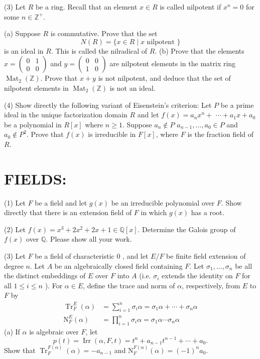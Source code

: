 \documentclass[10pt]{article}
\begin{document}
(3) Let $R$ be a ring. Recall that an element $x \in R$ is called nilpotent if $x^{n}=0$ for some $n \in \mathbb{Z}^{+}$.

(a) Suppose $R$ is commutative. Prove that the set
$$
N(R)=\{x \in R \mid x \text { nilpotent }\}
$$
is an ideal in $R$. This is called the nilradical of $R$. (b) Prove that the elements $x=\left(\begin{array}{ll}0 & 1 \\ 0 & 0\end{array}\right)$ and $y=\left(\begin{array}{cc}0 & 0 \\ 1 & 0\end{array}\right)$ are nilpotent elements in the matrix ring $\operatorname{Mat}_{2}(\mathbb{Z})$. Prove that $x+y$ is not nilpotent, and deduce that the set of nilpotent elements in $\operatorname{Mat}_{2}(\mathbb{Z})$ is not an ideal.

(4) Show directly the following variant of Eisenstein's criterion: Let $P$ be a prime ideal in the unique factorization domain $R$ and let $f(x)=a_{n} x^{n}+$ $\cdots+a_{1} x+a_{0}$ be a polynomial in $R[x]$ where $n \geq 1$. Suppose $a_{n} \notin P$ $a_{n-1}, \ldots, a_{0} \in P$ and $a_{0} \notin P^{2}$. Prove that $f(x)$ is irreducible in $F[x]$, where $F$ is the fraction field of $R$.

\section{FIELDS:}
(1) Let $F$ be a field and let $g(x)$ be an irreducible polynomial over $F$. Show directly that there is an extension field of $F$ in which $g(x)$ has a root.

(2) Let $f(x)=x^{3}+2 x^{2}+2 x+1 \in \mathbb{Q}[x]$. Determine the Galois group of $f(x)$ over $\mathbb{Q}$. Please show all your work.

(3) Let $F$ be a field of characteristic 0 , and let $E / F$ be finite field extension of degree $n$. Let $A$ be an algebraically closed field containing $F$. Let $\sigma_{1}, \ldots, \sigma_{n}$ be all the distinct embeddings of $E$ over $F$ into $A$ (i.e. $\sigma_{i}$ extends the identity on $F$ for all $1 \leq i \leq n$ ). For $\alpha \in E$, define the trace and norm of $\alpha$, respectively, from $E$ to $F$ by
$$
\begin{aligned}
\operatorname{Tr}_{F}^{E}(\alpha) &=\sum_{i=1}^{n} \sigma_{i} \alpha=\sigma_{1} \alpha+\cdots+\sigma_{n} \alpha \\
\mathrm{N}_{F}^{E}(\alpha) &=\prod_{i=1}^{n} \sigma_{i} \alpha=\sigma_{1} \alpha \cdots \sigma_{n} \alpha
\end{aligned}
$$
(a) If $\alpha$ is algebraic over $F$, let
$$
p(t)=\operatorname{Irr}(\alpha, F, t)=t^{n}+a_{n-1} t^{n-1}+\cdots+a_{0} .
$$
Show that $\operatorname{Tr}_{F}^{F(\alpha)}(\alpha)=-a_{n-1}$ and $\mathrm{N}_{F}^{F(\alpha)}(\alpha)=(-1)^{n} a_{0}$.
\end{document}

